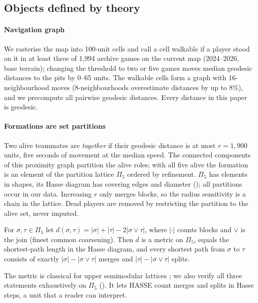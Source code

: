 \subsection{Objects defined by theory}

\paragraph*{Navigation graph}
We rasterise the map into 100-unit cells and call a cell walkable if a player stood on it in at least three of 1,994 archive games on the current map (2024--2026, base terrain); changing the threshold to two or five games moves median geodesic distances to the pits by 0--65 units.
The walkable cells form a graph with 16-neighbourhood moves (8-neighbourhoods overestimate distances by up to 8\%), and we precompute all pairwise geodesic distances.
Every distance in this paper is geodesic.

\paragraph*{Formations are set partitions}
Two alive teammates are \emph{together} if their geodesic distance is at most $r=1{,}900$ units, five seconds of movement at the median speed.
The connected components of this proximity graph partition the alive roles; with all five alive the formation is an element of the partition lattice $\Pi_5$ ordered by refinement.
$\Pi_5$ has  elements in  shapes, its Hasse diagram has  covering edges and diameter  (); all  partitions occur in our data.
Increasing $r$ only merges blocks, so the radius sensitivity is a chain in the lattice.
Dead players are removed by restricting the partition to the alive set, never imputed.


\begin{lemma}\label{lem:metric}
For $\sigma,\tau\in\Pi_5$ let $d(\sigma,\tau)=|\sigma|+|\tau|-2|\sigma\vee\tau|$, where $|\cdot|$ counts blocks and $\vee$ is the join (finest common coarsening).
Then $d$ is a metric on $\Pi_5$, equals the shortest-path length in the Hasse diagram, and every shortest path from $\sigma$ to $\tau$ consists of exactly $|\sigma|-|\sigma\vee\tau|$ merges and $|\tau|-|\sigma\vee\tau|$ splits.
\end{lemma}
The metric is classical for upper semimodular lattices \citep{monjardet1981metrics}; we also verify all three statements exhaustively on $\Pi_5$ ().
It lets HASSE count merges and splits in Hasse steps, a unit that a reader can interpret.

